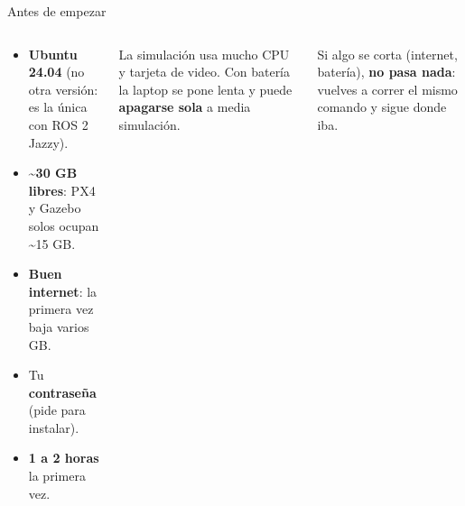 \begin{frame}{Antes de empezar}
  \begin{columns}[t]
    \begin{idea}[title={\small\bfseries Lo que necesitas},coltitle=black,colbacktitle=azulclaro]
      \small
      \begin{itemize}
        \item \textbf{Ubuntu 24.04} (no otra versión: es la única con ROS 2 Jazzy).
        \item \textbf{\textasciitilde30 GB libres}: PX4 y Gazebo solos ocupan \textasciitilde15 GB.
        \item \textbf{Buen internet}: la primera vez baja varios GB.
        \item Tu \textbf{contraseña} (pide  para instalar).
        \item \textbf{1 a 2 horas} la primera vez.
      \end{itemize}
    \end{idea}
    \begin{ojo}[title={\small\bfseries Conecta el cargador}]
      \small La simulación usa mucho CPU y tarjeta de video. Con batería la laptop se pone lenta y puede
      \textbf{apagarse sola} a media simulación.
    \end{ojo}
    \begin{idea}
      \small Si algo se corta (internet, batería), \textbf{no pasa nada}: vuelves a correr el mismo comando y
      sigue donde iba.
    \end{idea}
  \end{columns}
\end{frame}

